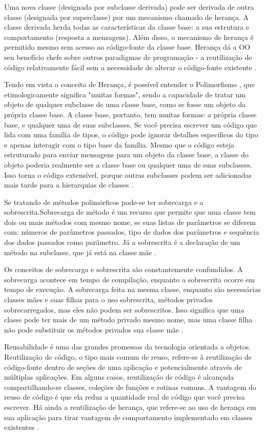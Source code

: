 Uma nova classe (designada por subclasse derivada) pode ser derivada de outra classe (designada por superclasse) por um mecanismo chamado de herança. A classe derivada herda todas as características da classe base: a sua estrutura e comportamento (resposta a mensagens). Além disso, o mecanismo de herança é permitido mesmo sem acesso ao código-fonte da classe base. Herança dá a OO seu benefício chefe sobre outros paradigmas de programação - a reutilização de código relativamente fácil sem a necessidade de alterar o código-fonte existente \cite{leavens2014}.

Tendo em vista o conceito de Herança, é possível entender o Polimorfismo , que etimologicamente significa "muitas formas", sendo a capacidade de tratar um objeto de qualquer subclasse de uma classe base, como se fosse um objeto da própria classe base. A classe base, portanto, tem muitas formas: a própria classe base, e qualquer uma de suas subclasses. Se você precisa escrever um código que lida com uma família de tipos, o código pode ignorar detalhes específicos do tipo e apenas interagir com o tipo base da família. Mesmo que o código esteja estruturado para enviar mensagens para um objeto da classe base, a classe do objeto poderia realmente ser a classe base ou qualquer uma de suas subclasses. Isso torna o  código extensível, porque outras subclasses podem ser adicionadas mais tarde para a hierarquias de classes \cite{venners1996}.

Se tratando de métodos polimórficos pode-se ter sobrecarga e a sobrescrita.Sobrecarga de método é um recurso que permite que uma classe tem dois ou mais métodos com mesmo nome, se suas listas de parâmetros se diferem com: números de parâmetros passados, tipo de dados dos parâmetros e sequência dos dados passados como parâmetro. Já a sobrescrita é a declaração de um método na subclasse, que já está na classe mãe \cite{singhOverload}.

Os conceitos de sobrecarga e sobrescrita são constantemente confundidos. A sobrecarga acontece em tempo de compilação, enquanto a sobrescrita  ocorre em tempo de execução. A sobrecarga  feita na mesma classe, enquanto são necessárias classes mães e suas filhas para o uso sobrescrita, métodos privados sobrecarregados, mas eles não podem ser sobrescritos. Isso significa que uma classe pode ter mais de um método privado mesmo nome, mas uma classe filha não pode substituir os métodos privados sua classe mãe \cite{singhDifference}.

Reusabilidade é uma das grandes promessas da tecnologia orientada a objetos. Reutilização de código, o tipo mais comum de reuso, refere-se à reutilização de código-fonte dentro de seções de uma aplicação e potencialmente através de múltiplas aplicações. Em alguns casos, reutilização de código é alcançada compartilhando-se classes, coleções de funções e rotinas comuns. A vantagem do reuso de código é que ela reduz a quantidade real de código que você precisa escrever. Há ainda a reutilização de herança, que refere-se ao uso de herança em sua aplicação para tirar vantagem de comportamento implementado em classes existentes \cite{ambler1998}.

